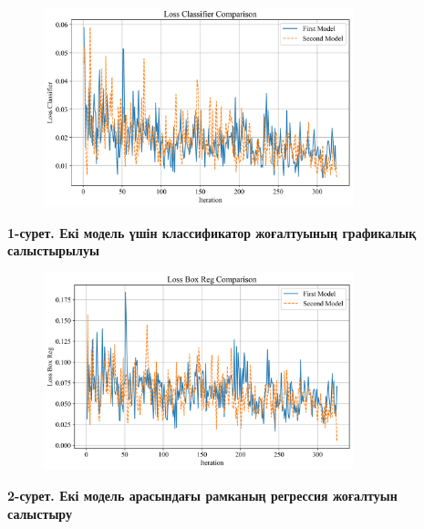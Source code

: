 \begin{figure}[H]
	\centering
	\includegraphics[width=0.8\textwidth]{media/ict/image23}
	\caption*{}
\end{figure}


{\bfseries 1-сурет. Екі модель үшін классификатор жоғалтуының графикалық
салыстырылуы}

\begin{figure}[H]
	\centering
	\includegraphics[width=0.8\textwidth]{media/ict/image24}
	\caption*{}
\end{figure}


{\bfseries 2-сурет. Екі модель арасындағы рамканың регрессия жоғалтуын
салыстыру}

